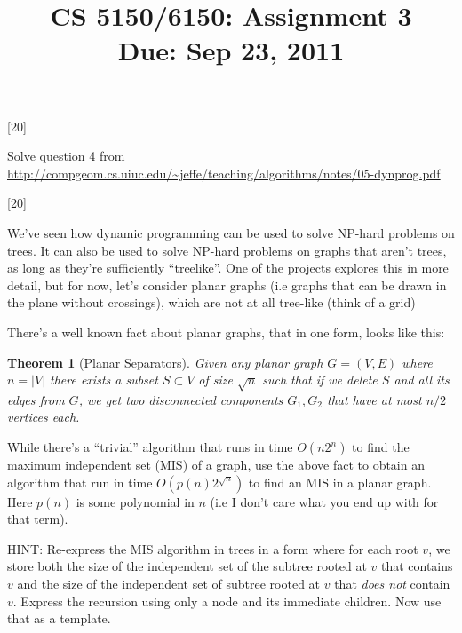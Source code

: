 \documentclass[addpoints]{exam}
\title{CS 5150/6150: Assignment 3 \\ Due: Sep 23, 2011}
\date{}
\newtheorem*{theorem}{Theorem}
\begin{document}
\maketitle
\begin{center}
\end{center}

\pointname{}
\bonuspointname{}
\pointformat{[\bfseries\thepoints]}


\begin{questions}

[20]

Solve question 4 from \url{http://compgeom.cs.uiuc.edu/~jeffe/teaching/algorithms/notes/05-dynprog.pdf}

[20]

We've seen how dynamic programming can be used to solve NP-hard problems on trees. It can also be used to solve NP-hard problems on graphs that aren't trees, as long as they're sufficiently ``treelike''. One of the projects explores this in more detail, but for now, let's consider planar graphs (i.e graphs that can be drawn in the plane without crossings), which are not at all tree-like (think of a grid)

There's a well known fact about planar graphs, that in one form, looks like this:
\begin{theorem}[Planar Separators]
  Given any planar graph $G = (V, E)$ where $n = |V|$ there exists a subset $S \subset V$ of size $\sqrt{n}$ such that if we delete $S$ and all its edges from $G$, we get two \emph{disconnected} components $G_1, G_2$ that have at most $n/2$ vertices each. 
\end{theorem}

While there's a ``trivial'' algorithm that runs in time $O(n 2^n)$ to find the maximum independent set (MIS) of a graph, use the above fact to obtain an algorithm that run in time $O(p(n)2^{\sqrt{n}})$ to find an MIS in a planar graph. Here $p(n)$ is some polynomial in $n$ (i.e I don't care what you end up with for that term).

HINT: Re-express the MIS algorithm in trees in a form where for each root $v$, we store both the size of the independent set of the subtree rooted at $v$ that contains $v$ and the size of the independent set of subtree rooted at $v$ that \emph{does not} contain $v$. Express the recursion using only a node and its immediate children.  Now use that as a template. 


\end{questions}
\end{document}
